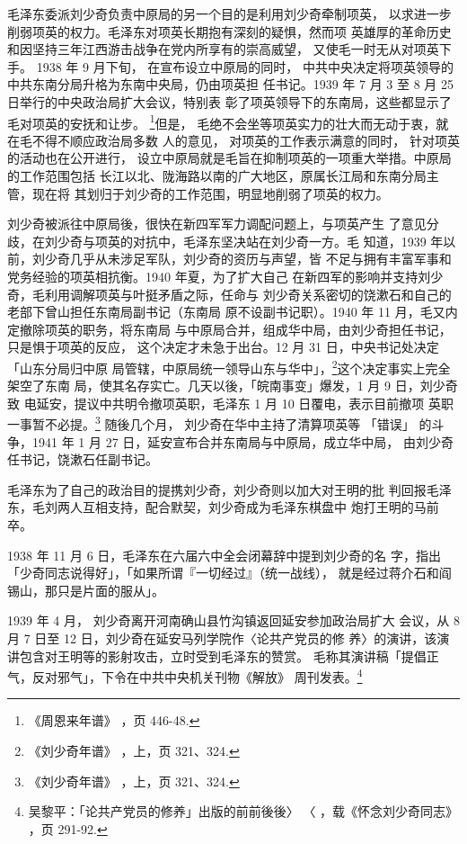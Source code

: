 毛泽东委派刘少奇负责中原局的另一个目的是利用刘少奇牵制项英，
以求进一步削弱项英的权力。毛泽东对项英长期抱有深刻的疑惧，然而项
英雄厚的革命历史和因坚持三年江西游击战争在党内所享有的崇高威望，
又使毛一时无从对项英下手。
1938 年 9 月下旬，
在宣布设立中原局的同时，
中共中央决定将项英领导的中共东南分局升格为东南中央局，仍由项英担
任书记。1939 年 7 月 3 至 8 月 25 日举行的中央政治局扩大会议，特别表
彰了项英领导下的东南局，这些都显示了毛对项英的安抚和让步。
\footnote{《周恩来年谱》
，页 446-48. 
}但是，
毛绝不会坐等项英实力的壮大而无动于衷，就在毛不得不顺应政治局多数
人的意见，
对项英的工作表示满意的同时，
针对项英的活动也在公开进行，
设立中原局就是毛旨在抑制项英的一项重大举措。中原局的工作范围包括
长江以北、陇海路以南的广大地区，原属长江局和东南分局主管，现在将
其划归于刘少奇的工作范围，明显地削弱了项英的权力。

刘少奇被派往中原局後，很快在新四军军力调配问题上，与项英产生
了意见分歧，在刘少奇与项英的对抗中，毛泽东坚决站在刘少奇一方。毛
知道，1939 年以前，刘少奇几乎从未涉足军队，刘少奇的资历与声望，皆
不足与拥有丰富军事和党务经验的项英相抗衡。1940 年夏，为了扩大自己
在新四军的影响并支持刘少奇，毛利用调解项英与叶挺矛盾之际，任命与
刘少奇关系密切的饶漱石和自己的老部下曾山担任东南局副书记（东南局
原不设副书记职）。1940 年 11 月，毛又内定撤除项英的职务，将东南局
与中原局合并，组成华中局，由刘少奇担任书记，只是惧于项英的反应，
这个决定才未急于出台。12 月 31 日，中央书记处决定「山东分局归中原
局管辖，中原局统一领导山东与华中」，\footnote{《刘少奇年谱》
，上，页 321、324. }这个决定事实上完全架空了东南
局，使其名存实亡。几天以後，「皖南事变」爆发，1 月 9 日，刘少奇致
电延安，提议中共明令撤项英职，毛泽东 1 月 10 日覆电，表示目前撤项
英职一事暂不必提。\footnote{《刘少奇年谱》
，上，页 321、324. 
} 随後几个月，
刘少奇在华中主持了清算项英等
「错误」
的斗争，1941 年 1 月 27 日，延安宣布合并东南局与中原局，成立华中局，
由刘少奇任书记，饶漱石任副书记。

毛泽东为了自己的政治目的提携刘少奇，刘少奇则以加大对王明的批
判回报毛泽东，毛刘两人互相支持，配合默契，刘少奇成为毛泽东棋盘中
炮打王明的马前卒。

1938 年 11 月 6 日，毛泽东在六届六中全会闭幕辞中提到刘少奇的名
字，指出「少奇同志说得好」，「如果所谓『一切经过』（统一战线），
就是经过蒋介石和阎锡山，那只是片面的服从」。

1939 年 4 月，
刘少奇离开河南确山县竹沟镇返回延安参加政治局扩大
会议，从 8 月 7 日至 12 日，刘少奇在延安马列学院作〈论共产党员的修
养〉的演讲，该演讲包含对王明等的影射攻击，立时受到毛泽东的赞赏。
毛称其演讲稿「提倡正气，反对邪气」，下令在中共中央机关刊物《解放》
周刊发表。\footnote{吴黎平：「论共产党员的修养」出版的前前後後〉
〈
，载《怀念刘少奇同志》
，页 291-92. 
}

